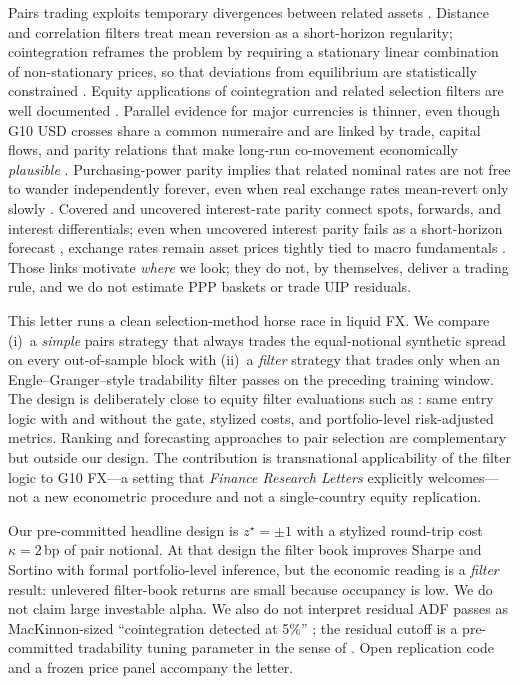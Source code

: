 \documentclass[11pt,a4paper]{article}
\begin{document}
Pairs trading exploits temporary divergences between related assets
\parencite{gatev2006,krauss2017}. Distance and correlation filters treat mean reversion as a
short-horizon regularity; cointegration reframes the problem by requiring a stationary linear
combination of non-stationary prices, so that deviations from equilibrium are statistically
constrained \parencite{engle1987,vidyamurthy2004}. Equity applications of cointegration and
related selection filters are well documented
\parencite{huck2015,rad2015,galenko2012,burgess2003}. Parallel evidence for major currencies
is thinner, even though G10 USD crosses share a common numeraire and are linked by trade,
capital flows, and parity relations that make long-run co-movement economically \emph{plausible}
\parencite{fama1984,rogoff1996,engelwest2005,dunis2011}. Purchasing-power parity implies that
related nominal rates are not free to wander independently forever, even when real exchange
rates mean-revert only slowly \parencite{rogoff1996}. Covered and uncovered interest-rate
parity connect spots, forwards, and interest differentials; even when uncovered interest parity
fails as a short-horizon forecast \parencite{fama1984}, exchange rates remain asset prices
tightly tied to macro fundamentals \parencite{engelwest2005}. Those links motivate
\emph{where} we look; they do not, by themselves, deliver a trading rule, and we do not
estimate PPP baskets or trade UIP residuals.

This letter runs a clean selection-method horse race in liquid FX. We compare (i)~a
\emph{simple} pairs strategy that always trades the equal-notional synthetic spread on every
out-of-sample block with (ii)~a \emph{filter} strategy that trades only when an
Engle--Granger--style tradability filter \parencite{engle1987,vidyamurthy2004} passes on the
preceding training window. The design is deliberately close to equity filter evaluations such
as \textcite{huck2015}: same entry logic with and without the gate, stylized costs, and
portfolio-level risk-adjusted metrics. Ranking and forecasting approaches to pair selection
\parencite{huck2009,huck2010} are complementary but outside our design. The contribution is
transnational applicability of the filter logic to G10 FX---a setting that \emph{Finance
Research Letters} explicitly welcomes---not a new econometric procedure and not a
single-country equity replication.

Our pre-committed headline design is $z^{\star}=\pm 1$ with a stylized round-trip cost
$\kappa=2$\,bp of pair notional. At that design the filter book improves Sharpe and Sortino
with formal portfolio-level inference, but the economic reading is a \emph{filter} result:
unlevered filter-book returns are small because occupancy is low. We do not claim large
investable alpha. We also do not interpret residual ADF passes as MacKinnon-sized
``cointegration detected at 5\%'' \parencite{mackinnon1994,mackinnon2010}; the residual cutoff
is a pre-committed tradability tuning parameter in the sense of \textcite{vidyamurthy2004}.
Open replication code and a frozen price panel accompany the letter.
\end{document}
